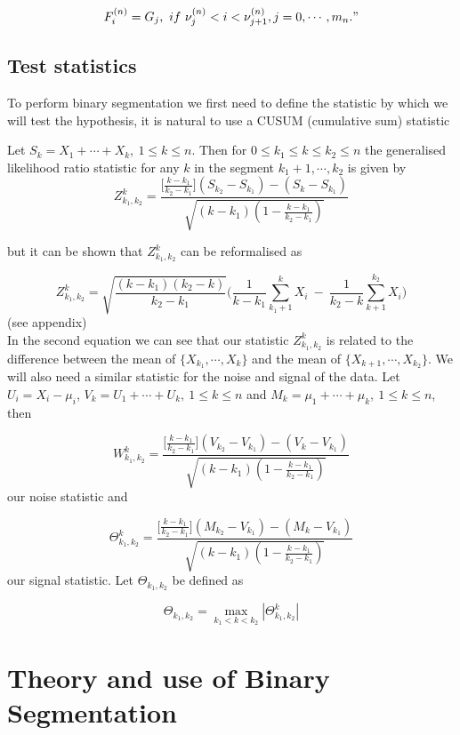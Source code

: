 \documentclass[a4paper, 12pt, notitlepage]{report}
\begin{document}
\[ F^{(n)}_i  = G_j, \ if \ \nu^{(n)}_j < i <  \nu^{(n)}_{j+1}, j = 0, \cdots, m_n."\]

\section{Test statistics}

To perform binary segmentation we first need to define the statistic by which we will test the hypothesis, it is natural to use a CUSUM (cumulative sum) statistic

Let \(S_k = X_1 + \cdots + X_k,\ 1 \leq k \leq n\). Then for \(0 \leq k_1 \leq k \leq k_2 \leq n\) the generalised likelihood ratio statistic for any $k$ in the segment \( {k_1 +1, \cdots, k_2} \) is given by
 \[ Z^k_{k_1, k_2} = \frac{\big [\frac{k - k_1}{k_2 - k_1} \big ](S_{k_2} - S_{k_1}) - (S_k - S_{k_1})}{\sqrt{(k - k_1)(1 - \frac{k - k_1}{k_2 - k_1})}} \]

but it can be shown that \(Z^k_{k_1, k_2}\) can be reformalised as

\[Z^k_{k_1, k_2} = \sqrt{\frac{(k - k_1)(k_2 - k)}{k_2 -k_1}}\Big (\frac{1}{k - k_1}\sum^k_{k_1+1} X_i \ - \ \frac{1}{k_2 - k}\sum^{k_2}_{k+1} X_i \Big ) \] \footnotesize(see appendix)\\

In the second equation we can see that our statistic \(Z^k_{k_1, k_2}\) is related to the difference between the mean of \(\{X_{k_1}, \cdots, X_k\}\) and the mean of \(\{X_{k+1}, \cdots, X_{k_2}\}\). We will also need a similar statistic for the noise and signal of the data. Let \(U_i  = X_i - \mu_i\), \(V_k=  U_1+ \cdots + U_k,\ 1 \leq k \leq n \) and \(M_k =   \mu_1+ \cdots + \mu_k,\ 1 \leq k \leq n\), then

\[W^k_{k_1, k_2} = \frac{\big [\frac{k - k_1}{k_2 - k_1} \big ](V_{k_2} - V_{k_1}) - (V_k - V_{k_1})}{\sqrt{(k - k_1)(1 - \frac{k - k_1}{k_2 - k_1})}} \]
our noise statistic and

\[\Theta^k_{k_1, k_2} = \frac{\big [\frac{k - k_1}{k_2 - k_1} \big ](M_{k_2} - V_{k_1}) - (M_k - V_{k_1})}{\sqrt{(k - k_1)(1 - \frac{k - k_1}{k_2 - k_1})}} \]
our signal statistic.
Let \(\Theta_{k_1, k_2}\) be defined as

\[\Theta_{k_1, k_2} = \max_{k_1 < k < k_2}|\Theta^k_{k_1, k_2}|\]

\chapter{Theory and use of Binary Segmentation}
%
\end{document}
